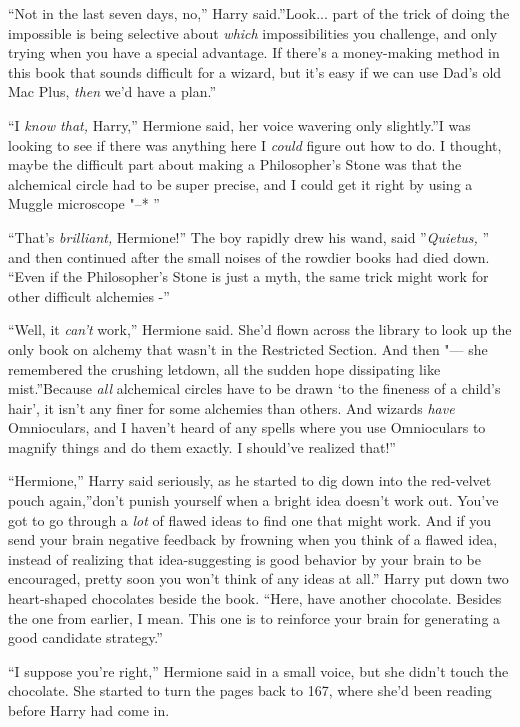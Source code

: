 ``Not in the last seven days, no,'' Harry said.''Look... part of
the trick of doing the impossible is being selective about \emph{which}
impossibilities you challenge, and only trying when you have a special
advantage. If there's a money-making method in this book that sounds
difficult for a wizard, but it's easy if we can use Dad's old Mac Plus,
\emph{then} we'd have a plan.''

``I \emph{know that,} Harry,'' Hermione said, her voice wavering only
slightly.''I was looking to see if there was anything here I
\emph{could} figure out how to do. I thought, maybe the difficult part
about making a Philosopher's Stone was that the alchemical circle had to
be super precise, and I could get it right by using a Muggle microscope
"--* ''

``That's \emph{brilliant,} Hermione!'' The boy rapidly drew his wand,
said ''\emph{Quietus,} '' and then continued after the small noises of the
rowdier books had died down. ``Even if the Philosopher's Stone is just a
myth, the same trick might work for other difficult alchemies -''

``Well, it \emph{can't} work,'' Hermione said. She'd flown across the
library to look up the only book on alchemy that wasn't in the
Restricted Section. And then "--- she remembered the crushing letdown, all
the sudden hope dissipating like mist.''Because \emph{all} alchemical
circles have to be drawn `to the fineness of a child's hair', it isn't
any finer for some alchemies than others. And wizards \emph{have}
Omnioculars, and I haven't heard of any spells where you use Omnioculars
to magnify things and do them exactly. I should've realized that!''

``Hermione,'' Harry said seriously, as he started to dig down into the
red-velvet pouch again,''don't punish yourself when a bright idea
doesn't work out. You've got to go through a \emph{lot} of flawed ideas
to find one that might work. And if you send your brain negative
feedback by frowning when you think of a flawed idea, instead of
realizing that idea-suggesting is good behavior by your brain to be
encouraged, pretty soon you won't think of any ideas at all.'' Harry put
down two heart-shaped chocolates beside the book. ``Here, have another
chocolate. Besides the one from earlier, I mean. This one is to
reinforce your brain for generating a good candidate strategy.''

``I suppose you're right,'' Hermione said in a small voice, but she
didn't touch the chocolate. She started to turn the pages back to 167,
where she'd been reading before Harry had come in.

